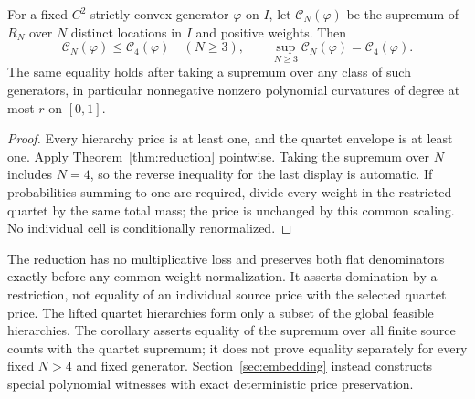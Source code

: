 \begin{corollary}
\label{cor:envelope}
For a fixed $C^2$ strictly convex generator $\varphi$ on $I$, let
$\mathcal C_N(\varphi)$ be the supremum of $R_N$ over $N$ distinct
locations in $I$ and positive weights. Then
\[
 \mathcal C_N(\varphi)\le\mathcal C_4(\varphi)\quad(N\ge3),
 \qquad
 \sup_{N\ge3}\mathcal C_N(\varphi)=\mathcal C_4(\varphi).
\]
The same equality holds after taking a supremum over any class of such
generators, in particular nonnegative nonzero polynomial curvatures of
degree at most $r$ on $[0,1]$.
\end{corollary}

\begin{proof}
Every hierarchy price is at least one, and the quartet envelope is at
least one. Apply Theorem~\ref{thm:reduction} pointwise. Taking the
supremum over $N$ includes $N=4$, so the reverse inequality for the last
display is automatic. If probabilities summing to one are required,
divide every weight in the restricted quartet by the same total mass;
the price is unchanged by this common scaling. No individual cell is
conditionally renormalized.
\end{proof}

\begin{remark}
The reduction has no multiplicative loss and preserves both flat
denominators exactly before any common weight normalization. It asserts
domination by a restriction, not equality of an individual source price
with the selected quartet price. The lifted quartet hierarchies form
only a subset of the global feasible hierarchies. The corollary asserts
equality of the supremum over all finite source counts with the quartet
supremum; it does not prove equality separately for every fixed $N>4$ and fixed
generator. Section~\ref{sec:embedding} instead constructs special polynomial
witnesses with exact deterministic price preservation.
\end{remark}

